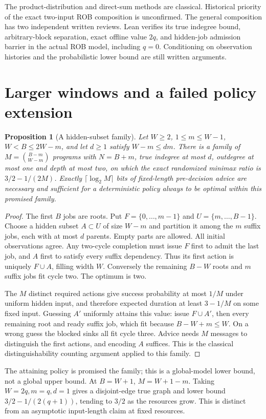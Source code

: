 \documentclass[11pt]{article}
\newtheorem{proposition}[theorem]{Proposition}
\begin{document}
The product-distribution and direct-sum methods are classical. Historical
priority of the exact two-input ROB composition is unconfirmed. The
general composition has two independent written reviews. Lean verifies
its true indegree bound, arbitrary-block separation, exact offline value
$2q$, and hidden-job admission barrier in the actual ROB model, including
$q=0$. Conditioning on observation histories and the probabilistic lower
bound are still written arguments.

\section{Larger windows and a failed policy extension}
\begin{proposition}[A hidden-subset family]
Let $W\ge2$, $1\le m\le W-1$, $W<B\le2W-m$, and let $d\ge1$ satisfy
$W-m\le dm$. There is a family of
$M=\binom{B-m}{W-m}$ programs with $N=B+m$, true indegree at most $d$,
outdegree at most one and depth at most two, on which the exact randomized
minimax ratio is $3/2-1/(2M)$. Exactly $\lceil\log_2M\rceil$ bits of
fixed-length pre-decision advice are necessary and sufficient for a
deterministic policy always to be optimal within this promised family.
\end{proposition}
\begin{proof}
The first $B$ jobs are roots. Put $F=\{0,\ldots,m-1\}$ and
$U=\{m,\ldots,B-1\}$. Choose a hidden subset $A\subset U$ of size $W-m$
and partition it among the $m$ suffix jobs, each with at most $d$ parents.
Empty parts are allowed. All initial observations agree. Any two-cycle
completion must issue $F$ first to admit the last job, and $A$ first to
satisfy every suffix dependency. Thus its first action is uniquely
$F\cup A$, filling width $W$. Conversely the remaining $B-W$ roots and
$m$ suffix jobs fit cycle two. The optimum is two.

The $M$ distinct required actions give success probability at most $1/M$
under uniform hidden input, and therefore expected duration at least
$3-1/M$ on some fixed input. Guessing $A'$ uniformly attains this value:
issue $F\cup A'$, then every remaining root and ready suffix job, which
fit because $B-W+m\le W$. On a wrong guess the blocked sinks all fit
cycle three. Advice needs $M$ messages to distinguish the first actions,
and encoding $A$ suffices. This is the classical distinguishability
counting argument applied to this family.
\end{proof}
The attaining policy is promised the family; this is a global-model lower
bound, not a global upper bound. At $B=W+1$, $M=W+1-m$.
Taking $W=2q,m=q,d=1$ gives a disjoint-edge true graph and lower bound
$3/2-1/(2(q+1))$, tending to $3/2$ as the resources grow. This is distinct
from an asymptotic input-length claim at fixed resources.
\end{document}
